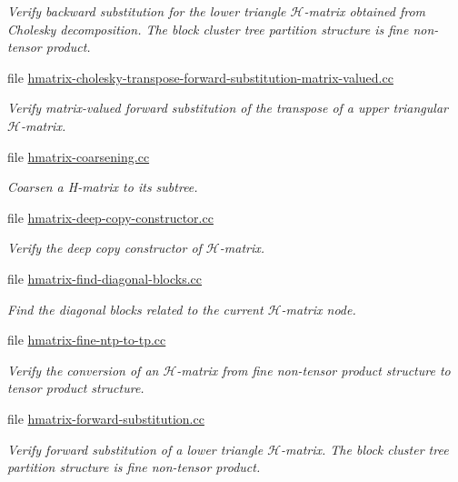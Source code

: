 \begin{DoxyCompactItemize}
\begin{DoxyCompactList}\small\item\em Verify backward substitution for the lower triangle $\mathcal{H}$-\/matrix obtained from Cholesky decomposition. The block cluster tree partition structure is fine non-\/tensor product. \end{DoxyCompactList}\item 
file \hyperlink{hmatrix-cholesky-transpose-forward-substitution-matrix-valued_8cc}{hmatrix-\/cholesky-\/transpose-\/forward-\/substitution-\/matrix-\/valued.\+cc}
\begin{DoxyCompactList}\small\item\em Verify matrix-\/valued forward substitution of the transpose of a upper triangular $\mathcal{H}$-\/matrix. \end{DoxyCompactList}\item 
file \hyperlink{hmatrix-coarsening_8cc}{hmatrix-\/coarsening.\+cc}
\begin{DoxyCompactList}\small\item\em Coarsen a H-\/matrix to its subtree. \end{DoxyCompactList}\item 
file \hyperlink{hmatrix-deep-copy-constructor_8cc}{hmatrix-\/deep-\/copy-\/constructor.\+cc}
\begin{DoxyCompactList}\small\item\em Verify the deep copy constructor of $\mathcal{H}$-\/matrix. \end{DoxyCompactList}\item 
file \hyperlink{hmatrix-find-diagonal-blocks_8cc}{hmatrix-\/find-\/diagonal-\/blocks.\+cc}
\begin{DoxyCompactList}\small\item\em Find the diagonal blocks related to the current $\mathcal{H}$-\/matrix node. \end{DoxyCompactList}\item 
file \hyperlink{hmatrix-fine-ntp-to-tp_8cc}{hmatrix-\/fine-\/ntp-\/to-\/tp.\+cc}
\begin{DoxyCompactList}\small\item\em Verify the conversion of an $\mathcal{H}$-\/matrix from fine non-\/tensor product structure to tensor product structure. \end{DoxyCompactList}\item 
file \hyperlink{hmatrix-forward-substitution_8cc}{hmatrix-\/forward-\/substitution.\+cc}
\begin{DoxyCompactList}\small\item\em Verify forward substitution of a lower triangle $\mathcal{H}$-\/matrix. The block cluster tree partition structure is fine non-\/tensor product. \end{DoxyCompactList}\item 

\end{DoxyCompactItemize}
